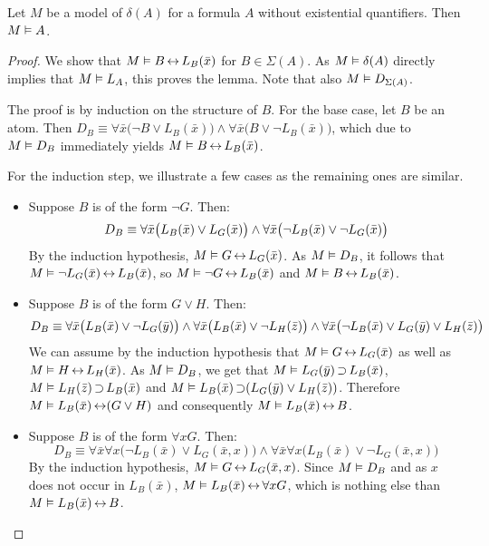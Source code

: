 \begin{lemma}
	Let $M$ be a model of $\delta(A)$ for a formula $A$ without existential quantifiers.
	Then $M \vDash A$.
	\label{lemma:delta_model}
\end{lemma}
\begin{proof}

	We show that $M \vDash B \operatorname{\leftrightarrow} L_B(\bar x)$ for $B \in \Sigma(A)$.
	As $M\vDash \delta(A)$ directly implies that $M\vDash L_A$, this proves the lemma.
	Note that also $M \vDash D_{\Sigma(A)}$.

	The proof is by induction on the structure of $B$.
	For the base case, let $B$ be an atom. Then
	$D_B\equiv \forall \bar x \big(\lnot B \lor L_B(\bar x)\big) \land \forall \bar x \big(B \lor \lnot L_B(\bar x)\big)$, which due to $M \vDash D_B$ immediately yields $M\vDash B \operatorname{\leftrightarrow} L_B(\bar x)$.

	For the induction step, we illustrate a few cases as the remaining ones are similar.
	\begin{itemize}
		\item Suppose $B$ is of the form $\lnot G$.
			Then:
			\[D_B \equiv \forall \bar x \big(L_B(\bar x) \lor L_G(\bar x)\big) \land\linebreak[0] \forall \bar x \big(\lnot L_B(\bar x) \lor \lnot L_G(\bar x)\big)\]
			By the induction hypothesis, $M \vDash G \operatorname{\leftrightarrow} L_G(\bar x)$.
			As $M \vDash D_B$, it follows that $M\vDash \lnot L_G(\bar x) \operatorname{\leftrightarrow} L_B(\bar x)$,
			so $M\vDash \lnot G \operatorname{\leftrightarrow} L_B(\bar x)$
			and $M\vDash B \operatorname{\leftrightarrow} L_B(\bar x)$.

		\item Suppose $B$ is of the form $G \lor H$.
			Then:
			\[D_B\equiv \forall \bar x \big(L_B(\bar x) \lor \lnot L_G(\bar y)\big) \land\linebreak[0] \forall \bar x \big(L_B(\bar x) \lor \lnot L_H(\bar z)\big) \land\linebreak[0] \forall \bar x \big(\lnot L_B(\bar x) \lor L_G(\bar y) \lor L_H(\bar z)\big)\]
			We can assume by the induction hypothesis that 
			$M \vDash G \operatorname{\leftrightarrow} L_G(\bar x)$ as well as 
			$M \vDash H \operatorname{\leftrightarrow} L_H(\bar x)$.
			As $M \vDash D_B$, 
			we get that
			$M\vDash L_G(\bar y) \operatorname{\supset} L_B(\bar x)$,
			$M\vDash L_H(\bar z) \operatorname{\supset} L_B(\bar x)$ and
			$M\vDash L_B(\bar x) \operatorname{\supset} (L_G(\bar y) \lor L_H(\bar z))$. 
			Therefore $M \vDash L_B(\bar x) \operatorname{\leftrightarrow}\allowbreak (G\lor H)$
			and consequently $M \vDash L_B(\bar x) \operatorname{\leftrightarrow} B$.

		\item Suppose $B$ is of the form $\forall x G$.
			Then:
			\[
			D_B\equiv \forall \bar x \forall x \big(\lnot L_B(\bar x) \lor L_G(\bar x, x)\big) \land \forall \bar x \forall x \big(L_B(\bar x) \lor \lnot L_G(\bar x, x)\big)\]
			By the induction hypothesis, $M \vDash G \operatorname{\leftrightarrow} L_G(\bar x, x)$.
			Since $M \vDash D_B$ and as $x$ does not occur in $L_B(\bar x)$, $M \vDash L_B(\bar x) \operatorname{\leftrightarrow} \forall x G$,
			which is nothing else than $M \vDash L_B(\bar x) \operatorname{\leftrightarrow} B$.
			\qedhere
	\end{itemize}


\end{proof}

